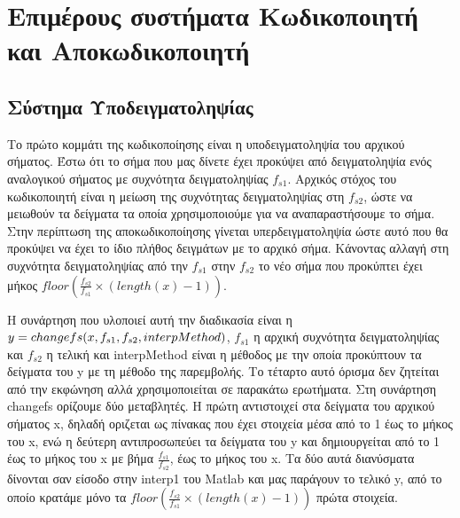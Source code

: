 \chapter{Επιμέρους συστήματα Κωδικοποιητή και Αποκωδικοποιητή}

\section{Σύστημα Υποδειγματοληψίας}

\par Το πρώτο κομμάτι της κωδικοποίησης είναι η υποδειγματοληψία του αρχικού σήματος. 
Έστω ότι το σήμα που μας δίνετε έχει προκύψει από δειγματοληψία ενός αναλογικού 
σήματος με συχνότητα δειγματοληψίας $f_{s1}$. Αρχικός στόχος του κωδικοποιητή 
είναι η μείωση της συχνότητας δειγματοληψίας στη $f_{s2}$, ώστε να μειωθούν τα δείγματα τα 
οποία χρησιμοποιούμε για να αναπαραστήσουμε το σήμα. Στην περίπτωση της αποκωδικοποίησης 
γίνεται υπερδειγματοληψία ώστε αυτό που θα προκύψει να έχει το ίδιο πλήθος δειγμάτων 
με το αρχικό σήμα. Κάνοντας αλλαγή στη συχνότητα δειγματοληψίας από την $f_{s1}$ στην 
$f_{s2}$ το νέο σήμα που προκύπτει έχει μήκος $floor(\frac{f_{s2}}{f_{s1}}\times
(length(x)-1))$.

\par Η συνάρτηση που υλοποιεί αυτή την διαδικασία είναι η $y=changefs(x,f_{s1},\\f_{s2},
interpMethod)$, $f_{s1}$ η αρχική συχνότητα δειγματοληψίας και $f_{s2}$ η τελική και interpMethod είναι η μέθοδος 
με την οποία προκύπτουν τα δείγματα του y με τη μέθοδο της παρεμβολής. Το τέταρτο αυτό 
όρισμα δεν ζητείται από την εκφώνηση αλλά χρησιμοποιείται σε παρακάτω ερωτήματα. 
Στη συνάρτηση changefs ορίζουμε δύο μεταβλητές. Η πρώτη αντιστοιχεί στα δείγματα του αρχικού σήματος 
x, δηλαδή οριζεται ως πίνακας που έχει στοιχεία μέσα από το 1 έως το μήκος του x, 
ενώ η δεύτερη αντιπροσωπεύει τα δείγματα του y και δημιουργείται από το 1 έως το μήκος 
του x με βήμα $\frac{f_{s1}}{f_{s2}}$, έως το μήκος του x. Τα δύο αυτά διανύσματα 
δίνονται σαν είσοδο στην interp1 του Matlab και μας παράγουν το τελικό y, από το οποίο 
κρατάμε μόνο τα $floor(\frac{f_{s2}}{f_{s1}}\times(length(x)-1))$ πρώτα στοιχεία.

